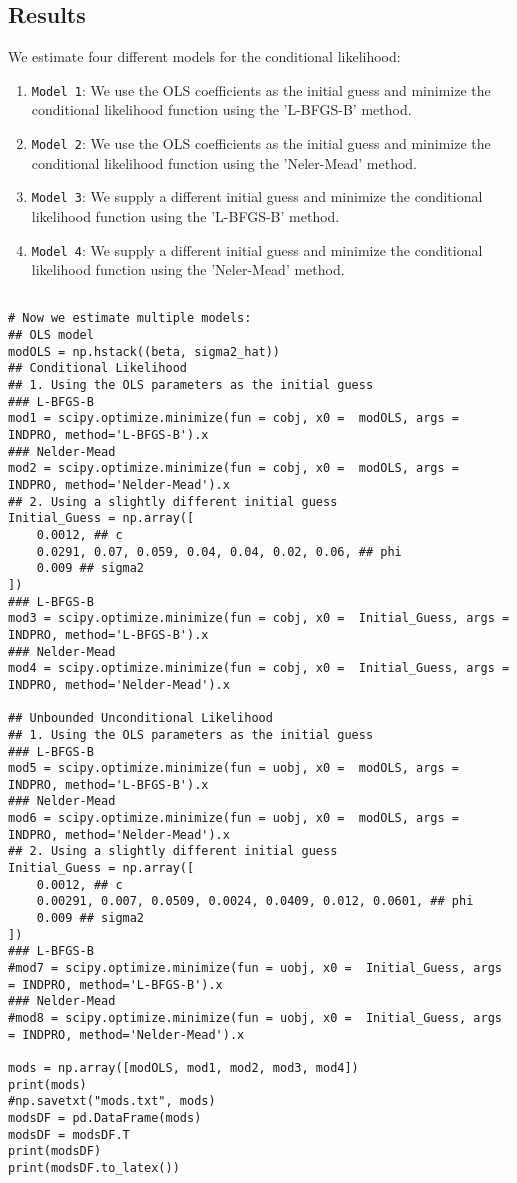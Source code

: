 \documentclass{article}
\begin{document}
\subsection{Results}
We estimate four different models for the conditional likelihood:
\begin{enumerate}
\item \texttt{Model 1}: We use the OLS coefficients as the initial guess and minimize the conditional likelihood function using the 'L-BFGS-B' method.
\item \texttt{Model 2}: We use the OLS coefficients as the initial guess and minimize the conditional likelihood function using the 'Neler-Mead' method.
\item \texttt{Model 3}: We supply a different initial guess and minimize the conditional likelihood function using the 'L-BFGS-B' method.
\item \texttt{Model 4}: We supply a different initial guess and minimize the conditional likelihood function using the  'Neler-Mead' method.
\end{enumerate}

\begin{verbatim}

# Now we estimate multiple models:
## OLS model
modOLS = np.hstack((beta, sigma2_hat))
## Conditional Likelihood
## 1. Using the OLS parameters as the initial guess
### L-BFGS-B
mod1 = scipy.optimize.minimize(fun = cobj, x0 =  modOLS, args = INDPRO, method='L-BFGS-B').x
### Nelder-Mead
mod2 = scipy.optimize.minimize(fun = cobj, x0 =  modOLS, args = INDPRO, method='Nelder-Mead').x
## 2. Using a slightly different initial guess
Initial_Guess = np.array([
    0.0012, ## c
    0.0291, 0.07, 0.059, 0.04, 0.04, 0.02, 0.06, ## phi
    0.009 ## sigma2 
])
### L-BFGS-B
mod3 = scipy.optimize.minimize(fun = cobj, x0 =  Initial_Guess, args = INDPRO, method='L-BFGS-B').x
### Nelder-Mead
mod4 = scipy.optimize.minimize(fun = cobj, x0 =  Initial_Guess, args = INDPRO, method='Nelder-Mead').x

## Unbounded Unconditional Likelihood
## 1. Using the OLS parameters as the initial guess
### L-BFGS-B
mod5 = scipy.optimize.minimize(fun = uobj, x0 =  modOLS, args = INDPRO, method='L-BFGS-B').x
### Nelder-Mead
mod6 = scipy.optimize.minimize(fun = uobj, x0 =  modOLS, args = INDPRO, method='Nelder-Mead').x
## 2. Using a slightly different initial guess
Initial_Guess = np.array([
    0.0012, ## c
    0.00291, 0.007, 0.0509, 0.0024, 0.0409, 0.012, 0.0601, ## phi
    0.009 ## sigma2 
])
### L-BFGS-B
#mod7 = scipy.optimize.minimize(fun = uobj, x0 =  Initial_Guess, args = INDPRO, method='L-BFGS-B').x
### Nelder-Mead
#mod8 = scipy.optimize.minimize(fun = uobj, x0 =  Initial_Guess, args = INDPRO, method='Nelder-Mead').x

mods = np.array([modOLS, mod1, mod2, mod3, mod4])
print(mods)
#np.savetxt("mods.txt", mods)
modsDF = pd.DataFrame(mods)
modsDF = modsDF.T
print(modsDF)
print(modsDF.to_latex())
\end{verbatim}
\end{document}
